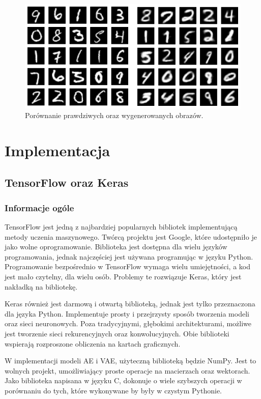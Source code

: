 \documentclass[a4paper,12pt]{book} %
\begin{document}
\begin{figure}[h!]
	\centering
	\includegraphics[width=12cm]{vaegeneracja.png}
	\caption{Porównanie prawdziwych oraz wygenerowanych obrazów.}
	\label{fig:vaegeneracja}
\end{figure}


\chapter{Implementacja}
\section{TensorFlow oraz Keras}
\subsection{Informacje ogóle}
TensorFlow jest jedną z najbardziej popularnych bibliotek implementującą metody uczenia maszynowego. Twórcą projektu jest Google, które udostępniło je jako wolne oprogramowanie. Biblioteka jest dostępna dla wielu języków programowania, jednak najczęściej jest używana programując w języku Python. Programowanie bezpośrednio w TensorFlow wymaga wielu umiejętności, a kod jest mało czytelny, dla wielu osób. Problemy te rozwiązuje Keras, który jest nakładką na bibliotekę. 

Keras również jest darmową i otwartą biblioteką, jednak jest tylko przeznaczona dla języka Python. Implementuje prosty i przejrzysty sposób tworzenia modeli oraz sieci neuronowych. Poza tradycyjnymi, głębokimi architekturami, możliwe jest tworzenie sieci rekurencyjnych oraz konwolucyjnych. Obie biblioteki wspierają rozproszone obliczenia na kartach graficznych. 

W implementacji modeli AE i VAE, użyteczną biblioteką będzie NumPy. Jest to wolnych projekt, umożliwiający proste operacje na macierzach oraz wektorach. Jako biblioteka napisana w języku C, dokonuje o wiele szybszych operacji w porównaniu do tych, które wykonywane by były w czystym Pythonie. 
\end{document}
